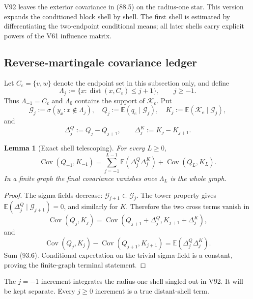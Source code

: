 \documentclass[11pt]{article}
\newtheorem{lemma}[theorem]{Lemma}
\theoremstyle{remark}
\begin{document}
V92 leaves the exterior covariance in (88.5) on the radius-one star.
This version expands the conditioned block shell by shell.  The first
shell is estimated by differentiating the two-endpoint conditional
means; all later shells carry explicit powers of the V61 influence
matrix.

\subsection{Reverse-martingale covariance ledger}

Let \(C_e=\{v,w\}\) denote the endpoint set in this subsection only,
and define
\[
 \Lambda_j:=\{x:\operatorname{dist}(x,C_e)\leq j+1\},
 \qquad j\geq-1.                                    \tag{93.1}
\]
Thus \(\Lambda_{-1}=C_e\) and \(\Lambda_0\) contains the support of
\(\mathcal K_e\).  Put
\[
 \mathscr G_j:=\sigma(y_x:x\notin\Lambda_j),
 \quad
 Q_j:=\mathbb E(q_e\mid\mathscr G_j),
 \quad
 K_j:=\mathbb E(\mathcal K_e\mid\mathscr G_j),      \tag{93.2}
\]
and
\[
 \Delta_j^Q:=Q_j-Q_{j+1},
 \qquad
 \Delta_j^K:=K_j-K_{j+1}.                           \tag{93.3}
\]

\begin{lemma}[Exact shell telescoping]
\label{lem:v17v93-telescope}
For every \(L\geq0\),
\[
\boxed{
 \operatorname{Cov}(Q_{-1},K_{-1})
 =\sum_{j=-1}^{L-1}
    \mathbb E(\Delta_j^Q\Delta_j^K)
  +\operatorname{Cov}(Q_L,K_L).}                   \tag{93.4}
\]
In a finite graph the final covariance vanishes once
\(\Lambda_L\) is the whole graph.
\end{lemma}

\begin{proof}
The sigma-fields decrease:
\(\mathscr G_{j+1}\subset\mathscr G_j\).  The tower property gives
\(\mathbb E(\Delta_j^Q\mid\mathscr G_{j+1})=0\), and similarly for
\(K\).  Therefore the two cross terms vanish in
\[
 \operatorname{Cov}(Q_j,K_j)
 =\operatorname{Cov}(Q_{j+1}+\Delta_j^Q,
                     K_{j+1}+\Delta_j^K),           \tag{93.5}
\]
and
\[
 \operatorname{Cov}(Q_j,K_j)-
 \operatorname{Cov}(Q_{j+1},K_{j+1})
 =\mathbb E(\Delta_j^Q\Delta_j^K).                  \tag{93.6}
\]
Sum (93.6).  Conditional expectation on the trivial sigma-field is a
constant, proving the finite-graph terminal statement.
\end{proof}

The \(j=-1\) increment integrates the radius-one shell singled out in
V92.  It will be kept separate.  Every \(j\geq0\) increment is a true
distant-shell term.
\end{document}
